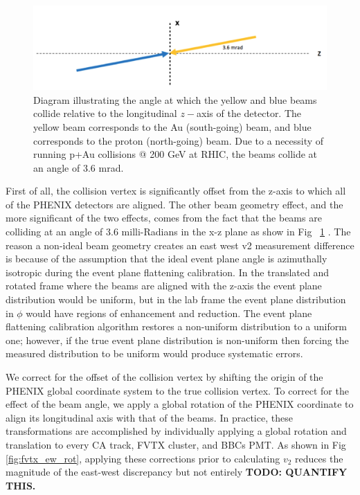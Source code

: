 \begin{figure}[h!]
\begin{center}
\includegraphics[width=0.75\linewidth]{figs/beam_angle.png}
\caption{Diagram illustrating the angle at which the yellow and blue beams collide relative to the longitudinal $z-$axis of the detector. The yellow beam corresponds to the Au (south-going) beam, and blue corresponds to the proton (north-going) beam. Due to a necessity of running p+Au collisions @ 200 GeV at RHIC, the beams collide at an angle of 3.6 mrad.}
\label{fig:diagram2}
\end{center}
\end{figure}

First of all, the collision vertex is significantly offset from the z-axis to which all of the PHENIX detectors are aligned. The other beam geometry effect, and the more significant of the two effects, comes from the fact that the beams are colliding at an angle of 3.6 milli-Radians in the x-z plane as show in Fig ~\ref{fig:diagram2} \cite{BNL_Run15_Operations}. The reason a non-ideal beam geometry creates an east west v2 measurement difference is because of the assumption that the ideal event plane angle is azimuthally isotropic during the event plane flattening calibration. In the translated and rotated frame where the beams are aligned with the z-axis the event plane distribution would be uniform, but in the lab frame the event plane distribution in $\phi$ would have regions of enhancement and reduction. The event plane flattening calibration algorithm restores a non-uniform distribution to a uniform one; however, if the true event plane distribution is non-uniform then forcing the measured distribution to be uniform would produce systematic errors.

We correct for the offset of the collision vertex by shifting the origin of the PHENIX global coordinate system to the true collision vertex. To correct for the effect of the beam angle, we apply a global rotation of the PHENIX coordinate to align its longitudinal axis with that of the beams. In practice, these transformations are accomplished by individually applying a global rotation and translation to every CA track, FVTX cluster, and BBCs PMT. As shown in Fig \ref{fig:fvtx_ew_rot}, applying these corrections prior to calculating $v_2$ reduces the magnitude of the east-west discrepancy but not entirely \textbf{TODO: QUANTIFY THIS.} 

